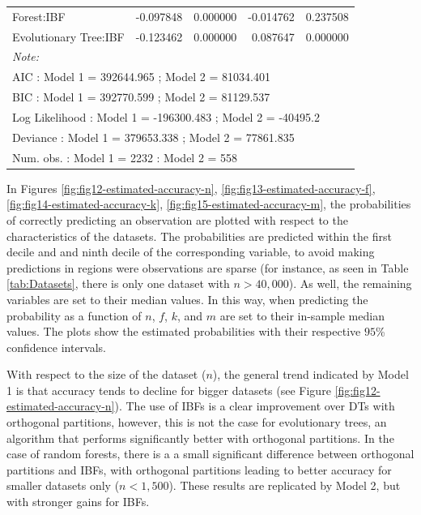 \documentclass[]{elsarticle} %
\begin{document}
\begin{table}
\begin{tabular}[t]{lrrrr}
\addlinespace
Forest:IBF & -0.097848 & 0.000000 & -0.014762 & 0.237508\\
Evolutionary Tree:IBF & -0.123462 & 0.000000 & 0.087647 & 0.000000\\
\bottomrule
\multicolumn{5}{l}{\textit{Note: }}\\
\multicolumn{5}{l}{AIC : Model 1 =  392644.965 ; Model 2 =  81034.401}\\
\multicolumn{5}{l}{BIC : Model 1 =  392770.599 ; Model 2 =  81129.537}\\
\multicolumn{5}{l}{Log Likelihood : Model 1 =  -196300.483 ; Model 2 =  -40495.2}\\
\multicolumn{5}{l}{Deviance : Model 1 =  379653.338 ; Model 2 = 77861.835}\\
\multicolumn{5}{l}{Num. obs. : Model 1 =  2232 : Model 2 =  558}\\
\end{tabular}
\end{table}

In Figures \ref{fig:fig12-estimated-accuracy-n},
\ref{fig:fig13-estimated-accuracy-f},
\ref{fig:fig14-estimated-accuracy-k},
\ref{fig:fig15-estimated-accuracy-m}, the probabilities of correctly
predicting an observation are plotted with respect to the
characteristics of the datasets. The probabilities are predicted within
the first decile and and ninth decile of the corresponding variable, to
avoid making predictions in regions were observations are sparse (for
instance, as seen in Table \ref{tab:Datasets}, there is only one dataset
with \(n>40,000\)). As well, the remaining variables are set to their
median values. In this way, when predicting the probability as a
function of \(n\), \(f\), \(k\), and \(m\) are set to their in-sample
median values. The plots show the estimated probabilities with their
respective \(95\)\% confidence intervals.

With respect to the size of the dataset (\(n\)), the general trend
indicated by Model 1 is that accuracy tends to decline for bigger
datasets (see Figure \ref{fig:fig12-estimated-accuracy-n}). The use of
IBFs is a clear improvement over DTs with orthogonal partitions,
however, this is not the case for evolutionary trees, an algorithm that
performs significantly better with orthogonal partitions. In the case of
random forests, there is a a small significant difference between
orthogonal partitions and IBFs, with orthogonal partitions leading to
better accuracy for smaller datasets only (\(n<1,500\)). These results
are replicated by Model 2, but with stronger gains for IBFs.
\end{document}
